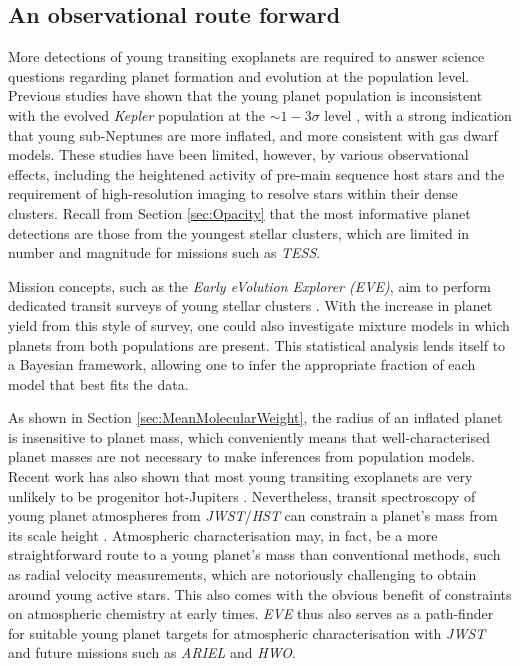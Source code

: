 \documentclass[fleqn,usenatbib]{mnras}
\begin{document}
\subsection{An observational route forward}
More detections of young transiting exoplanets are required to answer science questions regarding planet formation and evolution at the population level. Previous studies have shown that the young planet population is inconsistent with the evolved \textit{Kepler} population at the $\sim 1-3\sigma$ level \citep{Fernandes2022,Christiansen2023,Vach2024a,Fernandes2025}, with a strong indication that young sub-Neptunes are more inflated, and more consistent with gas dwarf models. These studies have been limited, however, by various observational effects, including the heightened activity of pre-main sequence host stars and the requirement of high-resolution imaging to resolve stars within their dense clusters. Recall from Section \ref{sec:Opacity} that the most informative planet detections are those from the youngest stellar clusters, which are limited in number and magnitude for missions such as \textit{TESS}. 

Mission concepts, such as the \textit{Early eVolution Explorer (EVE)}, aim to perform dedicated transit surveys of young stellar clusters \citep{Howard2024}. With the increase in planet yield from this style of survey, one could also investigate mixture models in which planets from both populations are present. This statistical analysis lends itself to a Bayesian framework, allowing one to infer the appropriate fraction of each model that best fits the data. 

As shown in Section \ref{sec:MeanMolecularWeight}, the radius of an inflated planet is insensitive to planet mass, which conveniently means that well-characterised planet masses are not necessary to make inferences from population models. Recent work has also shown that most young transiting exoplanets are very unlikely to be progenitor hot-Jupiters \citep{Karalis2024}. Nevertheless, transit spectroscopy of young planet atmospheres from \textit{JWST}/\textit{HST} can constrain a planet's mass from its scale height \citep[e.g.][]{Barat2024,Thao2024}. Atmospheric characterisation may, in fact, be a more straightforward route to a young planet's mass than conventional methods, such as radial velocity measurements, which are notoriously challenging to obtain around young active stars. This also comes with the obvious benefit of constraints on atmospheric chemistry at early times. \textit{EVE} thus also serves as a path-finder for suitable young planet targets for atmospheric characterisation with \textit{JWST} and future missions such as \textit{ARIEL} and \textit{HWO}.
\end{document}
